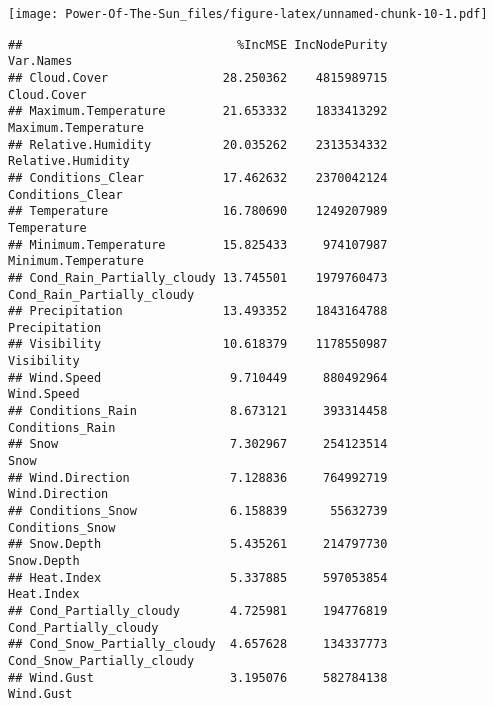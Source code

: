 \documentclass[
]{article}
\newenvironment{Shaded}{\begin{snugshade}}{\end{snugshade}}
\newcommand{\AttributeTok}[1]{\textcolor[rgb]{0.13,0.29,0.53}{#1}}
\newcommand{\CommentTok}[1]{\textcolor[rgb]{0.56,0.35,0.01}{\textit{#1}}}
\newcommand{\ConstantTok}[1]{\textcolor[rgb]{0.56,0.35,0.01}{#1}}
\newcommand{\FunctionTok}[1]{\textcolor[rgb]{0.13,0.29,0.53}{\textbf{#1}}}
\newcommand{\NormalTok}[1]{#1}
\newcommand{\SpecialCharTok}[1]{\textcolor[rgb]{0.81,0.36,0.00}{\textbf{#1}}}
\newcommand{\StringTok}[1]{\textcolor[rgb]{0.31,0.60,0.02}{#1}}
\begin{document}
\texttt{[image: Power-Of-The-Sun\_files/figure-latex/unnamed-chunk-10-1.pdf]}

\begin{Shaded}
\end{Shaded}

\begin{verbatim}
##                              %IncMSE IncNodePurity                  Var.Names
## Cloud.Cover                28.250362    4815989715                Cloud.Cover
## Maximum.Temperature        21.653332    1833413292        Maximum.Temperature
## Relative.Humidity          20.035262    2313534332          Relative.Humidity
## Conditions_Clear           17.462632    2370042124           Conditions_Clear
## Temperature                16.780690    1249207989                Temperature
## Minimum.Temperature        15.825433     974107987        Minimum.Temperature
## Cond_Rain_Partially_cloudy 13.745501    1979760473 Cond_Rain_Partially_cloudy
## Precipitation              13.493352    1843164788              Precipitation
## Visibility                 10.618379    1178550987                 Visibility
## Wind.Speed                  9.710449     880492964                 Wind.Speed
## Conditions_Rain             8.673121     393314458            Conditions_Rain
## Snow                        7.302967     254123514                       Snow
## Wind.Direction              7.128836     764992719             Wind.Direction
## Conditions_Snow             6.158839      55632739            Conditions_Snow
## Snow.Depth                  5.435261     214797730                 Snow.Depth
## Heat.Index                  5.337885     597053854                 Heat.Index
## Cond_Partially_cloudy       4.725981     194776819      Cond_Partially_cloudy
## Cond_Snow_Partially_cloudy  4.657628     134337773 Cond_Snow_Partially_cloudy
## Wind.Gust                   3.195076     582784138                  Wind.Gust
\end{verbatim}
\end{document}
